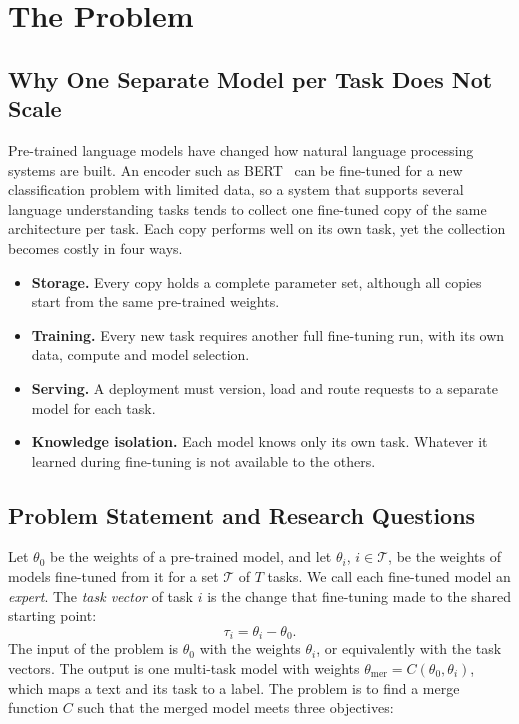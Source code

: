 \chapter{The Problem}
\label{ch:problem}

\section{Why One Separate Model per Task Does Not Scale}

Pre-trained language models have changed how natural language processing systems are built. An encoder such as BERT~\cite{devlin2019bert} can be fine-tuned for a new classification problem with limited data, so a system that supports several language understanding tasks tends to collect one fine-tuned copy of the same architecture per task. Each copy performs well on its own task, yet the collection becomes costly in four ways.

\begin{itemize}
  \item \textbf{Storage.} Every copy holds a complete parameter set, although all copies start from the same pre-trained weights.
  \item \textbf{Training.} Every new task requires another full fine-tuning run, with its own data, compute and model selection.
  \item \textbf{Serving.} A deployment must version, load and route requests to a separate model for each task.
  \item \textbf{Knowledge isolation.} Each model knows only its own task. Whatever it learned during fine-tuning is not available to the others.
\end{itemize}

\section{Problem Statement and Research Questions}
\label{sec:problem}

Let $\theta_0$ be the weights of a pre-trained model, and let $\theta_i$, $i\in\mathcal{T}$, be the weights of models fine-tuned from it for a set $\mathcal{T}$ of $T$ tasks. We call each fine-tuned model an \emph{expert}. The \emph{task vector} of task $i$ is the change that fine-tuning made to the shared starting point:
\begin{equation}
\tau_i=\theta_i-\theta_0 .
\label{eq:task-vector}
\end{equation}
The input of the problem is $\theta_0$ with the weights $\theta_i$, or equivalently with the task vectors. The output is one multi-task model with weights $\theta_{\mathrm{mer}}=C(\theta_0,\theta_i)$, which maps a text and its task to a label. The problem is to find a merge function $C$ such that the merged model meets three objectives:

